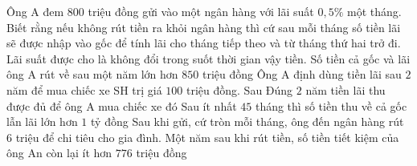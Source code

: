 \begin{ex}%
 Ông A đem $800$ triệu đồng gửi vào một ngân hàng với lãi suất $0{,}5\%$ một tháng. Biết rằng nếu không rút tiền ra khỏi ngân hàng thì cứ sau mỗi tháng số tiền lãi sẽ được nhập vào gốc để tính lãi cho tháng tiếp theo và từ tháng thứ hai trở đi. Lãi suất được cho là không đổi trong suốt  thời gian vậy tiền.
 \choiceTF 
   {Số tiền cả gốc và lãi ông A rút về sau một năm lớn hơn $850$ triệu đồng}
  {\True Ông A định dùng tiền lãi sau $2$ năm để mua chiếc xe SH trị giá $100$ triệu đồng. Sau Đúng  $2$ năm tiền lãi thu được đủ để ông A mua chiếc xe đó}
  {\True Sau ít nhất $45$ tháng thì số tiền thu về cả gốc lẫn lãi lớn  hơn $1$ tỷ đồng}
  {\True Sau khi gửi, cứ tròn mỗi tháng, ông đến ngân hàng  rút $6$ triệu để chi tiêu cho gia đình. Một năm sau khi rút tiền, số tiền tiết kiệm của ông An còn lại ít hơn $776$ triệu đồng}
\end{ex}

